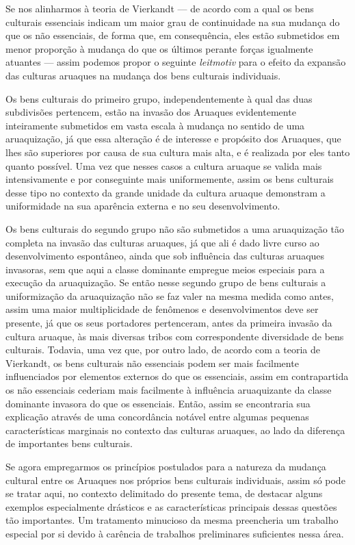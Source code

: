 Se nos alinharmos à teoria de Vierkandt --- de acordo com a qual os bens
culturais essenciais indicam um maior grau de continuidade na sua
mudança do que os não essenciais, de forma que, em consequência, eles
estão submetidos em menor proporção à mudança do que os últimos perante
forças igualmente atuantes --- assim podemos propor o seguinte
\textit{leitmotiv} para o efeito da expansão das culturas aruaques na
mudança dos bens culturais individuais.

Os bens culturais do primeiro grupo, independentemente à qual das duas
subdivisões pertencem, estão na invasão dos Aruaques evidentemente
inteiramente submetidos em vasta escala à mudança no sentido de uma
aruaquização, já que essa alteração é de interesse e propósito dos
Aruaques, que lhes são superiores por causa de sua cultura mais alta, e
é realizada por eles tanto quanto possível. Uma vez que nesses casos a
cultura aruaque se valida mais intensivamente e por conseguinte mais
uniformemente, assim os bens culturais desse tipo no contexto da grande
unidade da cultura aruaque demonstram a uniformidade na sua aparência
externa e no seu desenvolvimento.

Os bens culturais do segundo grupo não são submetidos a uma aruaquização
tão completa na invasão das culturas aruaques, já que ali é dado livre
curso ao desenvolvimento espontâneo, ainda que sob influência das
culturas aruaques invasoras, sem que aqui a classe dominante empregue
meios especiais para a execução da aruaquização. Se então nesse segundo
grupo de bens culturais a uniformização da aruaquização não se faz
valer na mesma medida como antes, assim uma maior multiplicidade de
fenômenos e desenvolvimentos deve ser presente, já que os seus
portadores pertenceram, antes da primeira invasão da cultura aruaque, às
mais diversas tribos com correspondente diversidade de bens culturais.
Todavia, uma vez que, por outro lado, de acordo com a teoria de
Vierkandt, os bens culturais não essenciais podem ser mais facilmente
influenciados por elementos externos do que os essenciais, assim em
contrapartida os não essenciais cederiam mais facilmente à influência
aruaquizante da classe dominante invasora do que os essenciais. Então,
assim se encontraria sua explicação através de uma concordância notável
entre algumas pequenas características marginais no contexto das
culturas aruaques, ao lado da diferença de importantes bens culturais.

Se agora empregarmos os princípios postulados para a natureza da
mudança cultural entre os Aruaques nos próprios bens culturais
individuais, assim só pode se tratar aqui, no contexto delimitado do
presente tema, de destacar alguns exemplos especialmente drásticos e as
características principais dessas questões tão importantes. Um
tratamento minucioso da mesma preencheria um trabalho especial por si
devido à carência de trabalhos preliminares suficientes nessa área.


